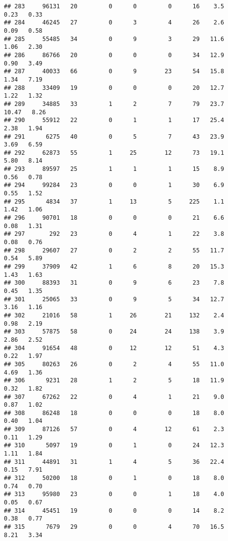 \documentclass[
]{article}
\begin{document}
\begin{verbatim}
## 283     96131   20         0      0         0      16    3.5    0.23   0.33
## 284     46245   27         0      3         4      26    2.6    0.09   0.58
## 285     55485   34         0      9         3      29   11.6    1.06   2.30
## 286     86766   20         0      0         0      34   12.9    0.90   3.49
## 287     40033   66         0      9        23      54   15.8    1.34   7.19
## 288     33409   19         0      0         0      20   12.7    1.22   1.32
## 289     34885   33         1      2         7      79   23.7   10.47   8.26
## 290     55912   22         0      1         1      17   25.4    2.38   1.94
## 291      6275   40         0      5         7      43   23.9    3.69   6.59
## 292     62873   55         1     25        12      73   19.1    5.80   8.14
## 293     89597   25         1      1         1      15    8.9    0.56   0.78
## 294     99284   23         0      0         1      30    6.9    0.55   1.52
## 295      4834   37         1     13         5     225    1.1    1.42   1.06
## 296     90701   18         0      0         0      21    6.6    0.08   1.31
## 297       292   23         0      4         1      22    3.8    0.08   0.76
## 298     29607   27         0      2         2      55   11.7    0.54   5.89
## 299     37909   42         1      6         8      20   15.3    1.43   1.63
## 300     88393   31         0      9         6      23    7.8    0.45   1.35
## 301     25065   33         0      9         5      34   12.7    3.16   1.16
## 302     21016   58         1     26        21     132    2.4    0.98   2.19
## 303     57875   58         0     24        24     138    3.9    2.86   2.52
## 304     91654   48         0     12        12      51    4.3    0.22   1.97
## 305     80263   26         0      2         4      55   11.0    4.69   1.36
## 306      9231   28         1      2         5      18   11.9    0.32   1.82
## 307     67262   22         0      4         1      21    9.0    0.87   1.02
## 308     86248   18         0      0         0      18    8.0    0.40   1.04
## 309     87126   57         0      4        12      61    2.3    0.11   1.29
## 310      5097   19         0      1         0      24   12.3    1.11   1.84
## 311     44891   31         1      4         5      36   22.4    0.15   7.91
## 312     50200   18         0      1         0      18    8.0    0.74   0.70
## 313     95980   23         0      0         1      18    4.0    0.05   0.67
## 314     45451   19         0      0         0      14    8.2    0.38   0.77
## 315      7679   29         0      0         4      70   16.5    8.21   3.34

\end{verbatim}
\end{document}
